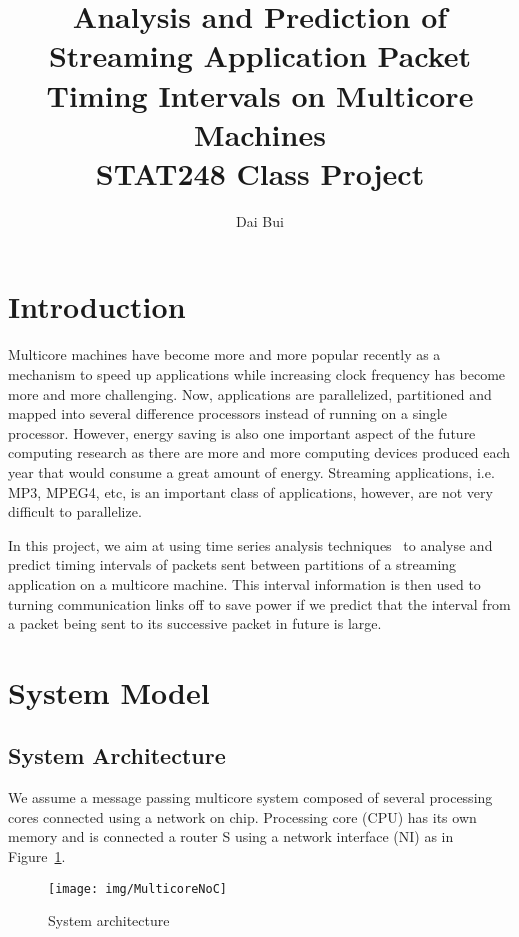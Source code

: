 \documentclass[12pt]{article}
\begin{document}
\title{Analysis and Prediction of Streaming
Application Packet Timing Intervals on Multicore Machines\\
STAT248 Class Project}
\author{Dai Bui}
\maketitle
\section{Introduction}
Multicore machines have become more and more popular recently as a mechanism to
speed up applications while increasing clock frequency has become more and more
challenging. Now, applications are parallelized, partitioned and mapped into
several difference processors instead of running on a single processor. However, energy
saving is also one important aspect of the future computing research as there
are more and more computing devices produced each year that would consume a great
amount of energy. Streaming applications, i.e. MP3, MPEG4, etc, is an
important class of applications, however, are not very difficult to parallelize.

In this project, we aim at using time series analysis
techniques~\cite{BrillingerTimeSeries, ShumwayTimeSeries} to analyse and predict
timing intervals of packets sent between partitions of a streaming
application on a multicore machine. This interval information is then used to
turning communication links off to save power if we predict that the interval
from a packet being sent to its successive packet in future is large. 

\section{System Model}
\subsection{System Architecture}
We assume a message passing multicore system composed of several processing
cores connected using a network on chip. Processing core (CPU) has its own
memory and is connected a router S using a network interface (NI) as in
Figure~\ref{fig:MulticoreNoC}.

\begin{figure}[ht!]
\centering
\texttt{[image: img/MulticoreNoC]}
\caption{System architecture}\label{fig:MulticoreNoC}
\end{figure}
\end{document}
